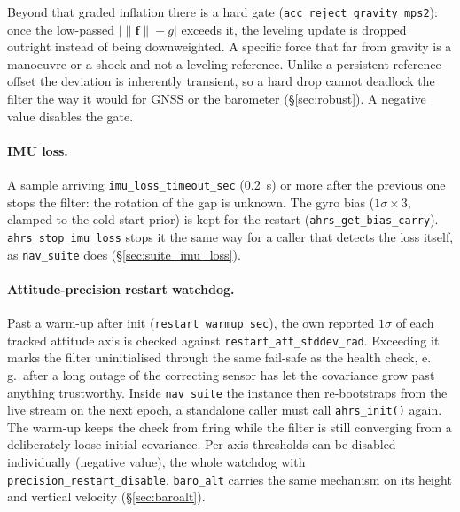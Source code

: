 \documentclass[11pt,a4paper]{article}
\newcommand{\vect}[1]{\bm{#1}}
\newcommand{\code}[1]{\texttt{#1}}
\begin{document}
Beyond that graded inflation there is a hard gate
(\code{acc\_\allowbreak{}reject\_\allowbreak{}gravity\_\allowbreak{}mps2}): once the low-passed
$\big|\|\vect{f}\|-g\big|$ exceeds it, the leveling update is dropped outright
instead of being downweighted. A specific force that far from gravity is a
manoeuvre or a shock and not a leveling reference. Unlike a persistent
reference offset the deviation is inherently transient, so a hard drop cannot
deadlock the filter the way it would for GNSS or the barometer
(\S\ref{sec:robust}). A negative value disables the gate.

\paragraph{IMU loss.} A sample arriving
\code{imu\_\allowbreak{}loss\_\allowbreak{}timeout\_\allowbreak{}sec}
(\SI{0.2}{\second}) or more after the previous one stops the filter: the
rotation of the gap is unknown. The gyro bias ($1\sigma \times 3$, clamped to
the cold-start prior) is kept for the restart
(\code{ahrs\_\allowbreak{}get\_\allowbreak{}bias\_\allowbreak{}carry}).
\code{ahrs\_\allowbreak{}stop\_\allowbreak{}imu\_\allowbreak{}loss} stops it
the same way for a caller that detects the loss itself, as
\code{nav\_\allowbreak{}suite} does (\S\ref{sec:suite_imu_loss}).

\paragraph{Attitude-precision restart watchdog.} Past a warm-up after init
(\code{restart\_\allowbreak{}warmup\_\allowbreak{}sec}), the own reported
$1\sigma$ of each tracked attitude axis is checked against
\code{restart\_\allowbreak{}att\_\allowbreak{}stddev\_\allowbreak{}rad}. Exceeding it
marks the filter uninitialised through the same fail-safe as the health check,
e.\,g.\ after a long outage of the correcting sensor has let the covariance grow
past anything trustworthy. Inside \code{nav\_\allowbreak{}suite} the instance then
re-bootstraps from the live stream on the next epoch, a standalone caller must
call \code{ahrs\_\allowbreak{}init()} again. The warm-up keeps the check from firing while
the filter is still converging from a deliberately loose initial covariance.
Per-axis thresholds can be disabled individually (negative value), the whole
watchdog with \code{precision\_\allowbreak{}restart\_\allowbreak{}disable}. \code{baro\_\allowbreak{}alt} carries the
same mechanism on its height and vertical velocity (\S\ref{sec:baroalt}).
\end{document}
